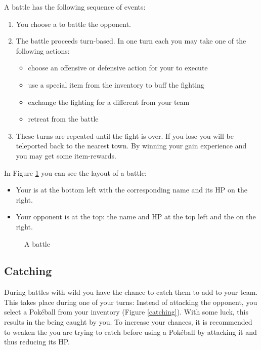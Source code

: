 A battle has the following sequence of events:
\begin{enumerate}
\item You choose a \poke{} to battle the opponent.
\item The battle proceeds turn-based. In one turn each you may take one of the following actions:
\begin{itemize}
\item choose an offensive or defensive action for your \poke{} to execute
\item use a special item from the inventory to buff the fighting \poke{}
\item exchange the fighting \poke{} for a different \poke{} from your team
\item retreat from the battle
\end{itemize}
\item These turns are repeated until the fight is over. If you lose you will be teleported back to the nearest town. By winning your \poke{} gain experience and you may get some item-rewards.
\end{enumerate}

In Figure \ref{battle} you can see the layout of a battle:
\begin{itemize}
\item Your \poke{} is at the bottom left with the corresponding name and its HP on the right.
\item Your opponent is at the top: the name and HP at the top left and the \poke{} on the right.
\end{itemize}

\begin{figure}[!ht]
\begin{center}
{%
\setlength{\fboxsep}{2pt}%
\setlength{\fboxrule}{1pt}%
%
}%
\end{center}
\caption[A \pokeT{} battle]{A \poke{} battle}
\label{battle}
\end{figure}

\newpage

\subsection[Catching \pokeT{}]{Catching \poke{}}
During battles with wild \poke{} you have the chance to catch them to add to your team. This takes place during one of your turns: Instead of attacking the opponent, you select a Pokéball from your inventory (Figure \ref{catching}). With some luck, this results in the \poke{} being caught by you. To increase your chances, it is recommended to weaken the \poke{} you are trying to catch before using a Pokéball by attacking it and thus reducing its HP.

